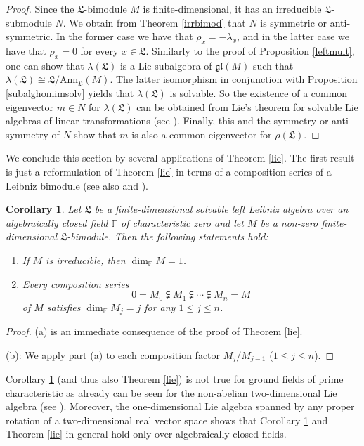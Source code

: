 \documentclass{amsart}
\newtheorem{cor}[thm]{Corollary}
\numberwithin{equation}{section}
\newcommand{\ann}{\mathrm{Ann}}
\newcommand{\F}{\mathbb{F}}
\newcommand{\lf}{\mathfrak{L}}
\newcommand{\gl}{\mathfrak{gl}}
\begin{document}
\begin{proof}
Since the $\lf$-bimodule $M$ is finite-dimensional, it has an irreducible $\lf$-sub\-module $N$.
We obtain from Theorem \ref{irrbimod} that $N$ is symmetric or anti-symmetric. In the former
case we have that $\rho_x=-\lambda_x$, and in the latter case we have that $\rho_x=0$ for
every $x\in\lf$. Similarly to the proof of Proposition \ref{leftmult}, one can show that $\lambda
(\lf)$ is a Lie subalgebra of $\gl(M)$ such that $\lambda(\lf)\cong\lf/\ann_\lf(M)$. The latter
isomorphism in conjunction with Proposition \ref{subalghomimsolv} yields that $\lambda(\lf)$ is
solvable. So the existence of a common eigenvector $m\in N$ for $\lambda(\lf)$ can be obtained
from Lie's theorem for solvable Lie algebras of linear transformations (see \cite[Theorem~4.1]{H}).
Finally, this and the symmetry or anti-symmetry of $N$ show that $m$ is also a common eigenvector
for $\rho(\lf)$.
\end{proof}

We conclude this section by several applications of Theorem \ref{lie}. The first result is just a
reformulation of Theorem \ref{lie} in terms of a composition series of a Leibniz bimodule (see also
\cite[Corollary 2]{P2} and \cite[Theorem 3.2]{DMS1}).

\begin{cor}\label{triang}
Let $\lf$ be a finite-dimensional solvable left Leibniz algebra over an algebraically closed field
$\F$ of characteristic zero and let $M$ be a non-zero finite-dimensional $\lf$-bimodule. Then the
following statements hold:
\begin{enumerate}
\item[(a)] If $M$ is irreducible, then $\dim_\F M=1$.
\item[(b)] Every composition series $$0=M_0\subsetneqq M_1\subsetneqq\cdots\subsetneqq
                M_n=M$$ of $M$ satisfies $\dim_\F M_j=j$ for any $1\le j\le n$.
\end{enumerate}
\end{cor}

\begin{proof}
(a) is an immediate consequence of the proof of Theorem \ref{lie}.

(b): We apply part (a) to each composition factor $M_j/M_{j-1}$ ($1\le j\le n$).
\end{proof}

 Corollary \ref{triang} (and thus also Theorem \ref{lie}) is not true for
ground fields of prime characteristic as already can be seen for the non-abelian two-dimensional
Lie algebra (see \cite[Example 5.9.1]{SF}). Moreover, the one-dimensional Lie algebra spanned
by any proper rotation of a two-dimensional real vector space shows that Corollary \ref{triang}
and Theorem \ref{lie} in general hold only over algebraically closed fields.
\vspace{-.1cm}
\end{document}
